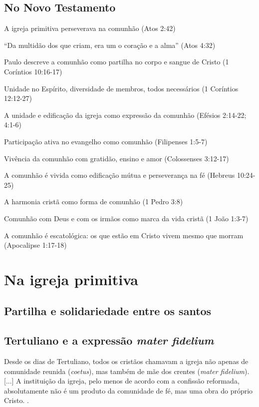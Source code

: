 \subsection{No Novo Testamento}

\item A igreja primitiva perseverava na comunhão (Atos 2:42)
\item ``Da multidão dos que criam, era um o coração e a alma'' (Atos 4:32)
\item Paulo descreve a comunhão como partilha no corpo e sangue de Cristo (1 Coríntios 10:16-17)
\item Unidade no Espírito, diversidade de membros, todos necessários (1 Coríntios 12:12-27)
\item A unidade e edificação da igreja como expressão da comunhão (Efésios 2:14-22; 4:1-6)
\item Participação ativa no evangelho como comunhão (Filipenses 1:5-7)
\item Vivência da comunhão com gratidão, ensino e amor (Colossenses 3:12-17)
\item A comunhão é vivida como edificação mútua e perseverança na fé (Hebreus 10:24-25)
\item A harmonia cristã como forma de comunhão (1 Pedro 3:8)
\item Comunhão com Deus e com os irmãos como marca da vida cristã (1 João 1:3-7)
\item A comunhão é escatológica: os que estão em Cristo vivem mesmo que morram (Apocalipse 1:17-18)


\section{Na igreja primitiva}

\subsection{Partilha e solidariedade entre os santos}

\subsection{Tertuliano e a expressão \textit{mater fidelium}}
\begin{citacao}
Desde os dias de Tertuliano, todos os cristãos chamavam a igreja não apenas de comunidade reunida (\textit{coetus}), mas também de mãe dos crentes (\textit{mater fidelium}). [...] A instituição da igreja, pelo menos de acordo com a confissão reformada, absolutamente não é um produto da comunidade de fé, mas uma obra do próprio Cristo. \cite[335]{bavinck2012}.
\end{citacao}

